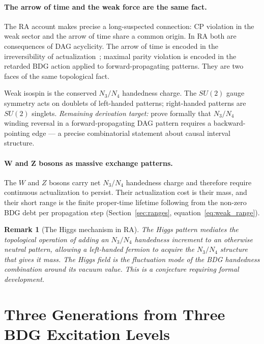 \documentclass[11pt,a4paper]{article}
\newtheorem{remark}[theorem]{Remark}
\begin{document}
\paragraph{The arrow of time and the weak force are the same fact.}
The RA account makes precise a long-suspected connection: CP violation in the
weak sector and the arrow of time share a common origin. In RA both are
consequences of DAG acyclicity. The arrow of time is encoded in the
irreversibility of actualization~\citep{Sandeman2026RAGC}; maximal parity
violation is encoded in the retarded BDG action applied to
forward-propagating patterns. They are two faces of the same topological fact.

Weak isospin is the conserved $N_3/N_4$ handedness charge. The $SU(2)$
gauge symmetry acts on doublets of left-handed patterns; right-handed patterns
are $SU(2)$ singlets. \emph{Remaining derivation target:} prove formally that
$N_3/N_4$ winding reversal in a forward-propagating DAG pattern requires a
backward-pointing edge --- a precise combinatorial statement about causal
interval structure.

\paragraph{W and Z bosons as massive exchange patterns.}
The $W$ and $Z$ bosons carry net $N_3/N_4$ handedness charge and therefore
require continuous actualization to persist. Their actualization cost is their
mass, and their short range is the finite proper-time lifetime following from
the non-zero BDG debt per propagation step (Section~\ref{sec:ranges},
equation~\eqref{eq:weak_range}).

\begin{remark}[The Higgs mechanism in RA]
The Higgs pattern mediates the topological operation of adding an $N_3/N_4$
handedness increment to an otherwise neutral pattern, allowing a left-handed
fermion to acquire the $N_3/N_4$ structure that gives it mass. The Higgs
field is the fluctuation mode of the BDG handedness combination around its
vacuum value. This is a conjecture requiring formal development.
\end{remark}

\section{Three Generations from Three BDG Excitation Levels}
\label{sec:generations}
\end{document}
